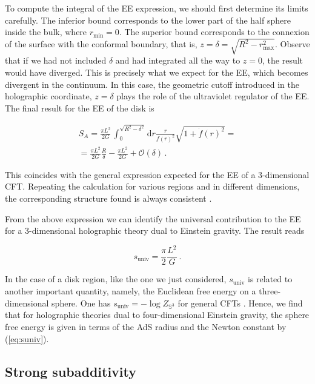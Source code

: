 \documentclass[twocolumn]{revtex4-2}
\providecommand{\eq}[2]{
    \begin{equation}
        #2
    \label{eq:#1}
    \end{equation}
}
\providecommand{\eqgat}[2]{
    \begin{gather}
        #2
    \label{eq:#1}
    \end{gather}
}
\begin{document}
To compute the integral of the EE expression, we should first determine its limits carefully. The inferior bound corresponds to the lower part of the half sphere inside the bulk, where $r_\text{min}=0$. The superior bound corresponds to the connexion of the surface with the conformal boundary, that is, $z=\delta=\sqrt{R^2-r_\text{max}^2}$. Observe that if we had not included $\delta$ and had integrated all the way to $z=0$, the result would have diverged. This is precisely what we expect for the EE, which becomes divergent in the continuum. In this case, the geometric cutoff introduced in the holographic coordinate, $z=\delta$ plays the role of the ultraviolet regulator of the EE. The final result for the EE of the disk is 
\eqgat{1sol}{
    S_A = \frac{\pi L^2}{2G} \, \int_0^{\sqrt{R^2-\delta^2}} \mathrm{d}r \frac{r}{f(r)^2} \sqrt{ 1 + \dot{f}(r)^2 } = \nonumber \\
    = \frac{\pi L^2}{2G} \frac{R}{\delta} - \frac{\pi L^2}{2G}+\mathcal{O}(\delta) \, . \nonumber
}
This coincides with the general expression expected for the EE of  a 3-dimensional CFT. Repeating the calculation for various regions and in different dimensions, the corresponding structure found is always consistent \cite{ryu_aspects_2006,ryu_holographic_2008}. 

From the above expression we can identify the universal contribution to the EE for a 3-dimensional holographic theory dual to Einstein gravity. The result reads
\eq{suniv}{
     s_\text{univ} = \frac{\pi}{2} \frac{L^2}{G} \ .
}

In the case of a disk region, like the one we just considered, $s_\text{univ}$ is related to another important quantity, namely, the Euclidean free energy on a three-dimensional sphere. One has $s_\text{univ}= -\log Z_{\mathbb{S}^3}$ for general CFTs \cite{casini_towards_2011}. Hence, we find that for holographic theories dual to four-dimensional Einstein gravity, the sphere free energy is given in terms of the AdS radius and the Newton constant by (\ref{eq:suniv}).


\subsection{Strong subadditivity} \label{ss:SS}
\end{document}
